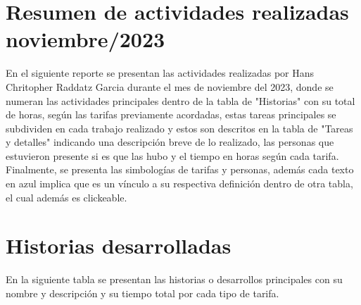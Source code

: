 \documentclass{article}
\begin{document}
\section*{Resumen de actividades realizadas noviembre/2023}

En el siguiente reporte se presentan las actividades realizadas por Hans Chritopher Raddatz Garcia durante el mes de noviembre del 2023, donde se numeran las actividades principales dentro de la tabla de "Historias" con su total de horas, según las tarifas previamente acordadas, estas tareas principales se subdividen en cada trabajo realizado y estos son descritos en la tabla de "Tareas y detalles" indicando una descripción breve de lo realizado, las personas que estuvieron presente si es que las hubo y el tiempo en horas según cada tarifa.
Finalmente, se presenta las simbologías de tarifas y personas, además cada texto en azul implica que es un vínculo a su respectiva definición dentro de otra tabla, el cual además es clickeable. 

\section{Historias desarrolladas}
En la siguiente tabla se presentan las historias o desarrollos principales con su nombre y descripción y su tiempo total por cada tipo de tarifa.
\end{document}
